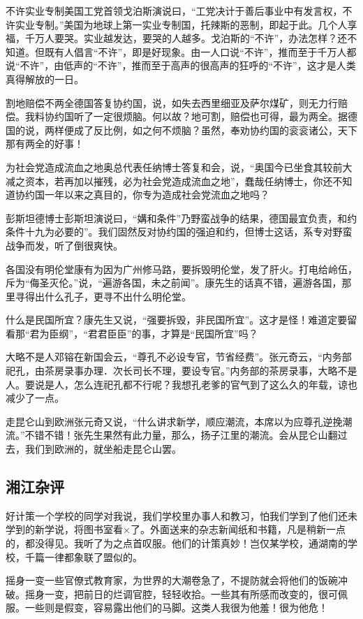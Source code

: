 不许实业专制美国工党首领戈泊斯演说曰，“工党决计于善后事业中有发言权，不许实业专制。”美国为地球上第一实业专制国，托辣斯的恶制，即起于此。几个人享福，千万人要哭。实业越发达，要哭的人越多。戈泊斯的“不许”，办法怎样？还不知道。但既有人倡言“不许”，即是好现象。由一人口说“不许”，推而至于千万人都说“不许”，由低声的“不许”，推而至于高声的很高声的狂呼的“不许”，这才是人类真得解放的一日。

割地赔偿不两全德国答复协约国，说，如失去西里细亚及萨尔煤矿，则无力行赔偿。我料协约国听了一定很烦脑。何以故？地可割，赔偿也可得，最为两全。据德国的说，两样便成了反比例，如之何不烦脑？虽然，奉劝协约国的衮衮诸公，天下那有两全的好事！

为社会党造成流血之地奥总代表任纳博士答复和会，说，“奥国今已坐食其较前大减之资本，若再加以摧残，必为社会党造成流血之地”，蠢哉任纳博士，你还不知道协约国一年以来之真目的，你专为造成社会党流血之地吗？

彭斯坦德博士彭斯坦演说曰，“媾和条件”乃野蛮战争的结果，德国最宜负责，和约条件十九为必要的”。我们固然反对协约国的强迫和约，但博士这话，系专对野蛮战争而发，听了倒很爽快。

各国没有明伦堂康有为因为广州修马路，要拆毁明伦堂，发了肝火。打电给岭伍，斥为“侮圣灭伦。”说，“遍游各国，未之前闻”。康先生的话真不错，遍游各国，那里寻得出什么孔子，更寻不出什么明伦堂。

什么是民国所宜？康先生又说，“强要拆毁，非民国所宜”。这才是怪！难道定要留看那“君为臣纲”，“君君臣臣”的事，才算是“民国所宜”吗？

大略不是人邓镕在新国会云，“尊孔不必设专官，节省经费”。张元奇云，“内务部祀孔，由茶房录事办理．次长司长不理，要设专官。”内务部的茶房录事，大略不是人。要说是人，怎么连祀孔都不行呢？我想孔老爹的官气到了这么久的年载，谅也减少了一点。

走昆仑山到欧洲张元奇又说，“什么讲求新学，顺应潮流，本席以为应尊孔逆挽潮流。”不错不错！张先生果然有此力量，那么，扬子江里的潮流。会从昆仑山翻过去，我们到欧洲的，就坐船走昆仑山罢。

\subsection{湘江杂评}

好计策一个学校的同学对我说，我们学校里办事人和教习，怕我们学到了他们还未学到的新学说，将图书室看×了。外面送来的杂志新闻纸和书籍，凡是稍新一点的，都没得见。我听了为之点首叹服。他们的计策真妙！岂仅某学校，通湖南的学校，千篇一律都象联了盟似的。

摇身一变一些官僚式教育家，为世界的大潮卷急了，不提防就会将他们的饭碗冲破。摇身一变，把前日的烂调官腔，轻轻收拾。一些其有所感而改变的，很可佩服。一些则是假变，容易露出他们的马脚。这类人我很为他羞！很为他危！


